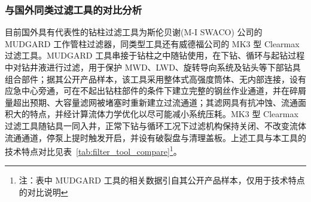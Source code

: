\subsubsection{与国外同类过滤工具的对比分析}
\label{sec:filter_tool_compare}

目前国外具有代表性的钻柱过滤工具为斯伦贝谢(M-I SWACO) 公司的 MUDGARD 工作管柱过滤器，同类型工具还有威德福公司的 MK3 型 Clearmax 过滤工具。MUDGARD 工具串接于钻柱之中随钻使用，在下钻、循环与起钻过程中对钻井液进行过滤，用于保护 MWD、LWD、旋转导向系统及钻头等下部钻具组合部件；据其公开产品样本，该工具采用整体式高强度筒体、无内部连接，设有应急中心旁通，可在不起出钻柱部件的条件下建立完整的钢丝作业通道，并在碎屑量超出预期、大容量滤网被堵塞时重新建立过流通道；其滤网具有抗冲蚀、流通面积大的特点，并经计算流体力学优化以尽可能减小系统压耗。MK3 型 Clearmax 过滤工具随钻具一同入井，正常下钻与循环工况下过滤机构保持关闭、不改变流体流通通道，停泵上提时触发开启，并设有破裂盘与清理盖板。上述工具与本工具的技术特点对比见表~\ref{tab:filter_tool_compare}\footnote{注：表中 MUDGARD 工具的相关数据引自其公开产品样本，仅用于技术特点的对比说明}。

